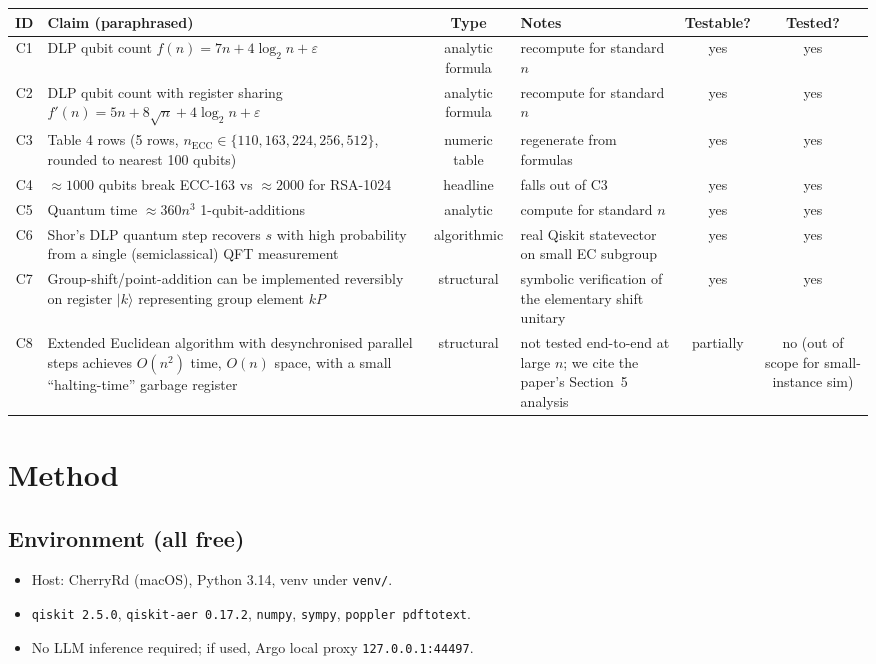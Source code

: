 \documentclass[10pt,letterpaper]{article}
\begin{document}
\begin{tabularx}{\linewidth}{clcXcc}
\toprule
ID & Claim (paraphrased) & Type & Notes & Testable? & Tested? \\
\midrule
C1 & DLP qubit count $f(n){=}7n{+}4\log_2 n{+}\varepsilon$
   & analytic formula & recompute for standard $n$
   & yes & yes \\
C2 & DLP qubit count with register sharing $f'(n){=}5n{+}8\sqrt n{+}4\log_2 n{+}\varepsilon$
   & analytic formula & recompute for standard $n$
   & yes & yes \\
C3 & Table 4 rows (5 rows, $n_\text{ECC}\!\in\!\{110,163,224,256,512\}$, rounded to nearest 100 qubits)
   & numeric table   & regenerate from formulas
   & yes & yes \\
C4 & $\approx 1000$ qubits break ECC-163 vs $\approx 2000$ for RSA-1024
   & headline & falls out of C3 & yes & yes \\
C5 & Quantum time $\approx 360 n^3$ 1-qubit-additions
   & analytic & compute for standard $n$
   & yes & yes \\
C6 & Shor's DLP quantum step recovers $s$ with high probability from a single (semiclassical) QFT measurement
   & algorithmic & real Qiskit statevector on small EC subgroup
   & yes & yes \\
C7 & Group-shift/point-addition can be implemented reversibly on register $|k\rangle$ representing group element $kP$
   & structural & symbolic verification of the elementary shift unitary
   & yes & yes \\
C8 & Extended Euclidean algorithm with desynchronised parallel steps achieves $O(n^2)$ time, $O(n)$ space, with a small ``halting-time'' garbage register
   & structural & not tested end-to-end at large $n$; we cite the paper's Section~5 analysis
   & partially & no (out of scope for small-instance sim) \\
\bottomrule
\end{tabularx}

\section{Method}

\subsection{Environment (all free)}
\begin{itemize}
  \item Host: CherryRd (macOS), Python 3.14, venv under \verb|venv/|.
  \item \texttt{qiskit 2.5.0}, \texttt{qiskit-aer 0.17.2}, \texttt{numpy}, \texttt{sympy}, \texttt{poppler pdftotext}.
  \item No LLM inference required; if used, Argo local proxy \verb|127.0.0.1:44497|.
\end{itemize}
\end{document}
